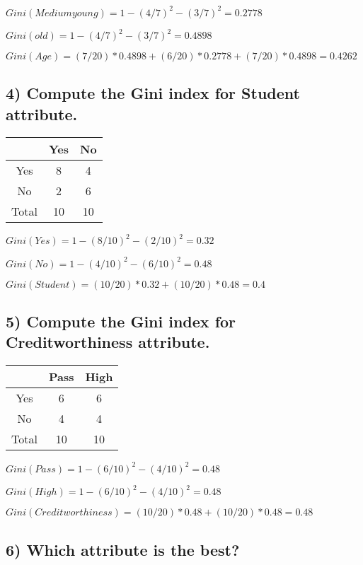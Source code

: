 		$Gini(Medium young) = 1 - (4/7)^{2} - (3/7)^{2} = 0.2778$

		$Gini(old) = 1 - (4/7)^{2} - (3/7)^{2} = 0.4898$
		
		$Gini(Age) = (7/20)*0.4898 + (6/20)*0.2778 + (7/20)*0.4898 = 0.4262$		


		\clearpage
		\subsection*{4) Compute the Gini index for Student attribute.}

		\begin{table}[H]
			\begin{tabular}{ c | c | c }
				 & Yes & No   \\ \hline
				Yes & 8 & 4 \\ \hline
				No & 2 & 6 \\ \hline
				Total & 10 & 10 \\
			\end{tabular}
		\end{table}

		$Gini(Yes) = 1 - (8/10)^{2} - (2/10)^{2} = 0.32$

		$Gini(No) = 1 - (4/10)^{2} - (6/10)^{2} = 0.48$
		
		$Gini(Student) = (10/20)*0.32 + (10/20)*0.48 = 0.4$


		\subsection*{5) Compute the Gini index for Creditworthiness attribute.}

		\begin{table}[H]
			\begin{tabular}{ c | c | c }
				 & Pass & High   \\ \hline
				Yes & 6 & 6 \\ \hline
				No & 4 & 4 \\ \hline
				Total & 10 & 10 \\
			\end{tabular}
		\end{table}

		$Gini(Pass) = 1 - (6/10)^{2} - (4/10)^{2} = 0.48$

		$Gini(High) = 1 - (6/10)^{2} - (4/10)^{2} = 0.48$
		
		$Gini(Creditworthiness) = (10/20)*0.48 + (10/20)*0.48 = 0.48$

		
		\subsection*{6) Which attribute is the best?}

